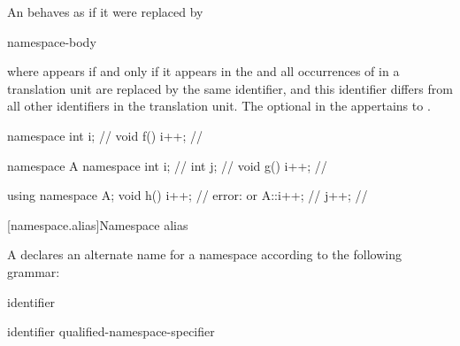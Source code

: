 \pnum
An  behaves as if it were
replaced by
\begin{ncsimplebnf}
   \terminal{\{}  \terminal{\}}\br
{}   \terminal{;}\br
{}  \terminal{\{} namespace-body \terminal{\}}
\end{ncsimplebnf}
where
 appears if and only if it appears in the
and all occurrences of  in a translation unit are replaced by
the same identifier, and this identifier differs from all other
identifiers in the translation unit.
The optional 
in the 
appertains to .
\begin{example}
\begin{codeblock}
namespace { int i; }            // 
void f() { i++; }               // 

namespace A {
  namespace {
    int i;                      // 
    int j;                      // 
  }
  void g() { i++; }             // 
}

using namespace A;
void h() {
  i++;                          // error:  or 
  A::i++;                       // 
  j++;                          // 
}
\end{codeblock}
\end{example}

[namespace.alias]{Namespace alias}%
%
%

\pnum
A  declares an alternate name for a
namespace according to the following grammar:

\begin{bnf}
\br
        identifier
\end{bnf}

\begin{bnf}
\br
         identifier \terminal{=} qualified-namespace-specifier \terminal{;}
\end{bnf}

